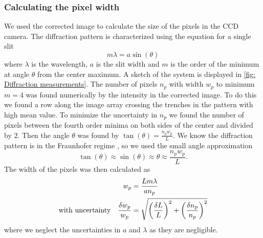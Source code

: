 \documentclass{emulateapj}
\begin{document}
\subsubsection{Calculating the pixel width}
We used the corrected image to calculate the size of the pixels in the CCD camera. The diffraction pattern is characterized using the equation for a single slit \citep{lab1}
\begin{equation}
	m\lambda = a\sin(\theta)
	\label{eq: Single slit diffraction}
\end{equation}
where $\lambda$ is the wavelength, $a$ is the slit width and $m$ is the order of the minimum at angle $\theta$ from the center maximum. A sketch of the system is displayed in \cref{fig: Diffraction measurements}. The number of pixels $n_p$ with width $w_p$ to minimum $m=4$ was found numerically by the intensity in the corrected image. To do this we found a row along the image array crossing the trenches in the pattern with high mean value. To minimize the uncertainty in $n_p$ we found the number of pixels between the fourth order minima on both sides of the center and divided by $2$. Then the angle $\theta$ was found by $\tan(\theta) = \frac{n_pw_p}{L}$. We know the diffraction pattern is in the Fraunhofer regime \citep{Fraunhofer}, so we used the small angle approximation
\begin{equation}
	\tan(\theta) \approx \sin(\theta) \approx \theta \approx \frac{n_pw_p}{L}.
	\label{eq: Small angle}
\end{equation}
The width of the pixels was then calculated as
\begin{align}
	w_p &= \frac{Lm\lambda}{an_p} \label{eq: pixel width}
	\\
	\qq*{with uncertainty} \frac{\delta w_p}{w_p} &= \sqrt{\qty(\frac{\delta L}{L})^2+\qty(\frac{\delta n_p}{n_p})^2} \label{eq: pixel width unc}
\end{align}
where we neglect the uncertainties in $a$ and $\lambda$ as they are negligible.
\end{document}
